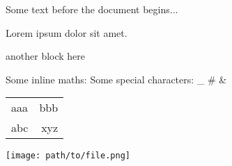 Some text before the document begins...


    Lorem ipsum dolor sit amet. %


    { another block here }


    Some inline maths: %
    Some special characters: _ # &

    \begin{tabular}{lr}
        aaa & bbb \\[1cm]
        abc & xyz
    \end{tabular}
    
    \texttt{[image: path/to/file.png]}
